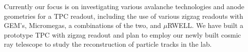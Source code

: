 Currently our focus is on investigating various avalanche technologies and anode geometries for a TPC readout, including the use of various zigzag readouts with GEM’s, Micromegas, a combinations of the two, and $\mu$RWELL. We have built a prototype TPC with zigzag readout and plan to employ our newly built cosmic ray telescope to study the reconstruction of particle tracks in the lab. 

